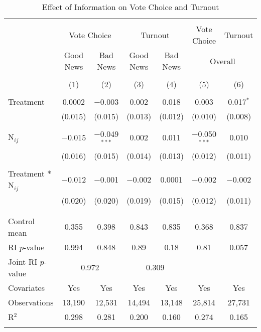 
\begin{table}[!htbp] \centering 
  \caption{Effect of Information on Vote Choice and Turnout} 
  \label{main_results} 
\begin{tabular}{@{\extracolsep{1pt}}lcccccc} 
\\[-1.8ex]\hline 
\hline \\[-1.8ex] 
 & \multicolumn{2}{c}{Vote Choice}&\multicolumn{2}{c}{Turnout}& Vote Choice & Turnout \\ 
\cline{2-7} 
 & Good News & Bad News & Good News & Bad News & \multicolumn{2}{c}{Overall} \\ 
\\[-1.8ex] & (1) & (2) & (3) & (4) & (5) & (6)\\ 
\hline \\[-1.8ex] 
 Treatment & 0.0002 & $-$0.003 & 0.002 & 0.018 & 0.003 & 0.017$^{*}$ \\ 
  & (0.015) & (0.015) & (0.013) & (0.012) & (0.010) & (0.008) \\ 
  & & & & & & \\ 
 N$_{ij}$ & $-$0.015 & $-$0.049$^{***}$ & 0.002 & 0.011 & $-$0.050$^{***}$ & 0.010 \\ 
  & (0.016) & (0.015) & (0.014) & (0.013) & (0.012) & (0.011) \\ 
  & & & & & & \\ 
 Treatment * N$_{ij}$ & $-$0.012 & $-$0.001 & $-$0.002 & 0.0001 & $-$0.002 & $-$0.002 \\ 
  & (0.020) & (0.020) & (0.019) & (0.015) & (0.012) & (0.011) \\ 
  & & & & & & \\ 
\hline \\[-1.8ex] 
Control mean & 0.355 & 0.398 & 0.843 & 0.835 & 0.368 & 0.837 \\ 
RI $p$-value & 0.994 & 0.848 & 0.89 & 0.18 & 0.81 & 0.057 \\ 
Joint RI $p$-value & \multicolumn{2}{c}{0.972} & \multicolumn{2}{c}{0.309} \\
Covariates & Yes & Yes & Yes & Yes & Yes & Yes \\ 
Observations & 13,190 & 12,531 & 14,494 & 13,148 & 25,814 & 27,731 \\ 
R$^{2}$ & 0.298 & 0.281 & 0.200 & 0.160 & 0.274 & 0.165 \\ 
\hline 
\hline \\[-1.8ex] 
\end{tabular} 

\end{table}
